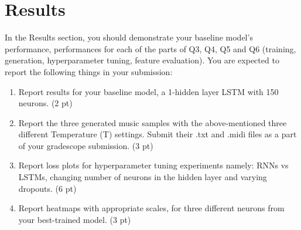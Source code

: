 \section*{Results}
In the Results section, you should demonstrate your baseline model’s performance, performances for each of the parts of Q3, Q4, Q5 and Q6 (training, generation, hyperparameter tuning, feature evaluation).
You are expected to report the following things in your submission:
\begin{enumerate}[label=\alph*]
  \item Report results for your baseline model, a 1-hidden layer LSTM with 150 neurons. (2 pt)
  \item Report the three generated music samples with the above-mentioned three different Temperature (T) settings. Submit their .txt and .midi files as a part of your gradescope submission. (3 pt)
  \item  Report loss plots for hyperparameter tuning experiments namely: RNNs vs LSTMs, changing number of neurons in the hidden layer and varying dropouts. (6 pt)
  \item Report heatmaps with appropriate scales, for three different neurons from your best-trained model. (3 pt)
\end{enumerate}
